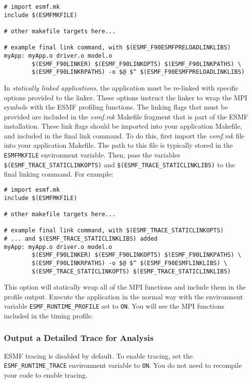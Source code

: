 \begin{verbatim}
# import esmf.mk
include $(ESMFMKFILE)

# other makefile targets here...

# example final link command, with $(ESMF_F90ESMFPRELOADLINKLIBS)
myApp: myApp.o driver.o model.o
        $(ESMF_F90LINKER) $(ESMF_F90LINKOPTS) $(ESMF_F90LINKPATHS) \
        $(ESMF_F90LINKRPATHS) -o $@ $^ $(ESMF_F90ESMFPRELOADLINKLIBS)
\end{verbatim}

In {\em statically linked applications}, the application must be re-linked
with specific options provided to the linker.  These options instruct the linker
to wrap the MPI symbols with the ESMF profiling functions. The linking flags that
must be provided are included in the {\em esmf.mk} Makefile fragment that
is part of the ESMF installation. These link flags should be imported into
your application Makefile, and included in the final link command. To do this,
first import the {\em esmf.mk} file into your application Makefile. The path
to this file is typically stored in the {\tt ESMFMKFILE} environment variable.
Then, pass the variables {\tt \$(ESMF\_TRACE\_STATICLINKOPTS)} and
{\tt \$(ESMF\_TRACE\_STATICLINKLIBS)} to the final linking command.  For example:

\begin{verbatim}
# import esmf.mk
include $(ESMFMKFILE)

# other makefile targets here...

# example final link command, with $(ESMF_TRACE_STATICLINKOPTS)
# ... and $(ESMF_TRACE_STATICLINKLIBS) added
myApp: myApp.o driver.o model.o
        $(ESMF_F90LINKER) $(ESMF_F90LINKOPTS) $(ESMF_F90LINKPATHS) \
        $(ESMF_F90LINKRPATHS) -o $@ $^ $(ESMF_F90ESMFLINKLIBS) \
        $(ESMF_TRACE_STATICLINKOPTS) $(ESMF_TRACE_STATICLINKLIBS)
\end{verbatim}

This option will statically wrap all of the MPI functions and include them
in the profile output.  Execute the application in the normal way
with the environment variable {\tt ESMF\_RUNTIME\_PROFILE} set to {\tt ON}.
You will see the MPI functions included in the timing profile.

\subsubsection{Output a Detailed Trace for Analysis}


ESMF tracing is disabled by default. To enable tracing, set the
{\tt ESMF\_RUNTIME\_TRACE} environment variable to {\tt ON}. You
do not need to recompile your code to enable tracing.

